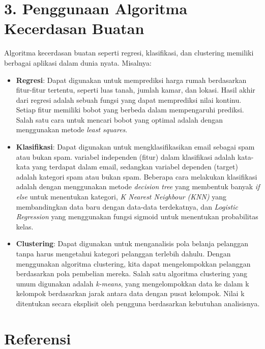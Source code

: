 \documentclass[a4paper]{article}
\begin{document}
\section*{3. Penggunaan Algoritma Kecerdasan Buatan}

Algoritma kecerdasan buatan seperti regresi, klasifikasi, dan clustering memiliki berbagai aplikasi dalam dunia nyata. Misalnya:

\begin{itemize}
    \item \textbf{Regresi}: Dapat digunakan untuk memprediksi harga rumah berdasarkan fitur-fitur tertentu, seperti luas tanah, jumlah kamar, dan lokasi. Hasil akhir dari regresi adalah sebuah fungsi yang dapat memprediksi nilai kontinu. Setiap fitur memiliki bobot yang berbeda dalam mempengaruhi prediksi. Salah satu cara untuk mencari bobot yang optimal adalah dengan menggunakan metode \textit{least squares}.

    \item \textbf{Klasifikasi}: Dapat digunakan untuk mengklasifikasikan email sebagai spam atau bukan spam. variabel independen (fitur) dalam klasifikasi adalah kata-kata yang terdapat dalam email, sedangkan variabel dependen (target) adalah kategori spam atau bukan spam. Beberapa cara melakukan klasifikasi adalah dengan menggunakan metode \textit{decision tree} yang membentuk banyak \textit{if else} untuk menentukan kategori, \textit{K Nearest Neighbour (KNN)} yang membandingkan data baru dengan data-data terdekatnya, dan \textit{Logistic Regression} yang menggunakan fungsi sigmoid untuk menentukan probabilitas kelas.

    \item \textbf{Clustering}: Dapat digunakan untuk menganalisis pola belanja pelanggan tanpa harus mengetahui kategori pelanggan terlebih dahulu. Dengan menggunakan algoritma clustering, kita dapat mengelompokkan pelanggan berdasarkan pola pembelian mereka. Salah satu algoritma clustering yang umum digunakan adalah \textit{k-means}, yang mengelompokkan data ke dalam k kelompok berdasarkan jarak antara data dengan pusat kelompok. Nilai k ditentukan secara eksplisit oleh pengguna berdasarkan kebutuhan analisisnya.

\end{itemize}

\section*{Referensi}
\end{document}
